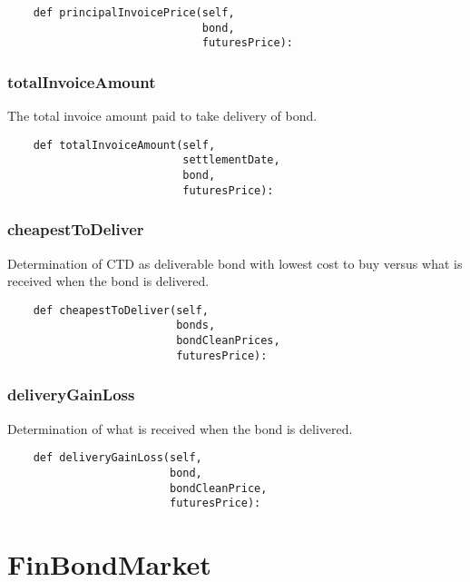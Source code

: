 \documentclass[twoside,11pt]{book}
\begin{document}
\begin{lstlisting}
    def principalInvoicePrice(self,
                              bond,
                              futuresPrice):
\end{lstlisting}

\subsubsection*{{\bf totalInvoiceAmount}}
The total invoice amount paid to take delivery of bond.  

\begin{lstlisting}
    def totalInvoiceAmount(self,
                           settlementDate,
                           bond,
                           futuresPrice):
\end{lstlisting}

\subsubsection*{{\bf cheapestToDeliver}}
Determination of CTD as deliverable bond with lowest cost to buy versus what is received when the bond is delivered.  

\begin{lstlisting}
    def cheapestToDeliver(self,
                          bonds,
                          bondCleanPrices,
                          futuresPrice):
\end{lstlisting}

\subsubsection*{{\bf deliveryGainLoss}}
Determination of what is received when the bond is delivered.  

\begin{lstlisting}
    def deliveryGainLoss(self,
                         bond,
                         bondCleanPrice,
                         futuresPrice):
\end{lstlisting}

\newpage
\section{FinBondMarket}
\end{document}
